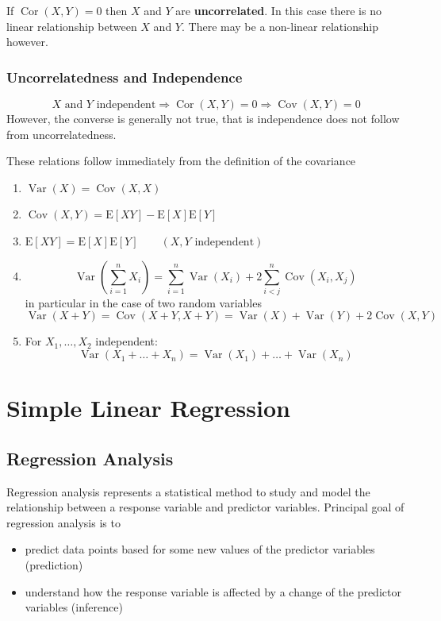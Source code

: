 \documentclass[11pt]{article}
\theoremstyle{definition}
\newcommand*\ev[1]{\mathrel{\text{E}\left[#1\right]}}
\newcommand*\Cov[1]{\mathop{\text{Cov}}\left(#1\right)}
\newcommand*\Cor[1]{\mathop{\text{Cor}}\left(#1\right)}
\newcommand*\Var[1]{\mathop{\text{Var}}\left(#1\right)}
\begin{document}
\begin{definition}
	If $\Cor{X,Y}=0$ then $X$ and $Y$ are \textbf{uncorrelated}. In this case there is no linear relationship between $X$ and $Y$. There may be a non-linear relationship however.
\end{definition}

\subsubsection{Uncorrelatedness and Independence}
\begin{equation*}
	X\text{ and } Y \text{ independent} \Rightarrow \Cor{X,Y}=0\Rightarrow \Cov{X,Y}=0
\end{equation*}
However, the converse is generally not true, that is independence does not follow from uncorrelatedness.

\vspace{1em}
\noindent
These relations follow immediately from the definition of the covariance
\begin{enumerate}
	\item $\Var{X} = \Cov{X,X}$
	\item $\Cov{X,Y} = \ev{XY} - \ev{X}\ev{Y}$
	\item $\ev{XY} = \ev{X}\ev{Y}\qquad (X,Y \text{ independent})$
	\item
	\begin{equation*}
		\Var{\sum_{i=1}^{n}X_i} = \sum_{i=1}^{n}\Var{X_i} + 2\sum_{i<j}^{n}\Cov{X_i,X_j}
	\end{equation*}
	in particular in the case of two random variables
	\begin{equation*}
		\Var{X + Y} = \Cov{X + Y, X + Y} = \Var{X} + \Var{Y} + 2\Cov{X,Y}
	\end{equation*}
	\item For $X_1,\dots,X_2$ independent:
	\begin{equation*}
		\Var{X_1+\dots+X_n} = \Var{X_1} + \dots + \Var{X_n}
	\end{equation*}
\end{enumerate}



\section{Simple Linear Regression}
\subsection{Regression Analysis}
Regression analysis represents a statistical method to study and model the relationship between a response variable and predictor variables. Principal goal of regression analysis is to
\begin{itemize}[noitemsep]
	\item predict data points based for some new values of the predictor variables (prediction)
	\item understand how the response variable is affected by a change of the predictor variables (inference)
\end{itemize}
\end{document}
